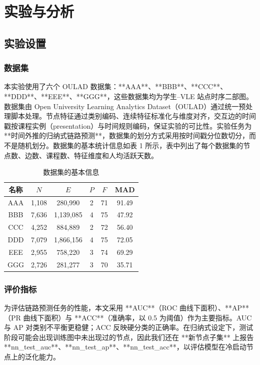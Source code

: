 \section{实验与分析}

\subsection{实验设置}

\subsubsection{数据集}

本实验使用了六个 OULAD 数据集：**AAA**、**BBB**、**CCC**、**DDD**、**EEE**、**GGG**，这些数据集均为学生–VLE 站点时序二部图。数据集由 Open University Learning Analytics Dataset（OULAD）通过统一预处理脚本处理。节点特征通过类别编码、连续特征标准化与维度对齐，交互边的时间戳按课程实例（presentation）与时间规则编码，保证实验的可比性。实验任务为**时间外推的归纳式链路预测**，数据集的划分方式采用按时间戳分位数切分，而不是随机划分。数据集的基本统计信息如表 1 所示，表中列出了每个数据集的节点数、边数、课程数、特征维度和人均活跃天数。

\begin{table}[ht]
\centering
\caption{数据集的基本信息}
\begin{tabular}{|c|c|c|c|c|c|}
\hline
名称 & \(N\) & \(E\) & \(P\) & \(F\) & MAD \\
\hline
AAA & 1,108 & 280,990 & 2 & 71 & 91.49 \\
BBB & 7,636 & 1,139,085 & 4 & 75 & 47.92 \\
CCC & 4,252 & 884,889 & 2 & 72 & 56.40 \\
DDD & 7,079 & 1,866,156 & 4 & 75 & 72.05 \\
EEE & 2,955 & 758,220 & 3 & 74 & 69.29 \\
GGG & 2,726 & 281,277 & 3 & 70 & 35.71 \\
\hline
\end{tabular}
\end{table}

\subsubsection{评价指标}

为评估链路预测任务的性能，本文采用 **AUC**（ROC 曲线下面积）、**AP**（PR 曲线下面积）与 **ACC**（准确率，以 0.5 为阈值）作为主要指标。AUC 与 AP 对类别不平衡更稳健；ACC 反映硬分类的正确率。在归纳式设定下，测试阶段可能会出现训练图中未出现过的节点，因此我们还在 **新节点子集** 上报告 **nn\_test\_auc**、**nn\_test\_ap**、**nn\_test\_acc**，以评估模型在冷启动节点上的泛化能力。

